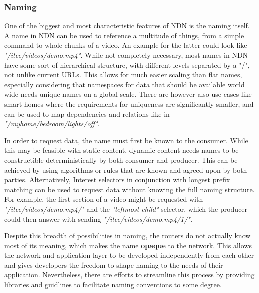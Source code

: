 \subsubsection{Naming}



One of the biggest and most characteristic features of NDN is the naming itself. A name in NDN can be used to reference a multitude of things, from a simple command to whole chunks of a video. An example for the latter could look like \textit{"/itec/videos/demo.mp4"}. While not completely necessary, most names in NDN have some sort of hierarchical structure, with different levels separated by a "/", not unlike current URLs. This allows for much easier scaling than flat names, especially considering that namespaces for data that should be available world wide needs unique names on a global scale. There are however also use cases like smart homes where the requirements for uniqueness are significantly smaller, and can be used to map dependencies and relations like in \textit{"/myhome/bedroom/lights/off"}.

In order to request data, the name must first be known to the consumer. While this may be feasible with static content, dynamic content needs names to be constructible deterministically by both consumer and producer. This can be achieved by using algorithms or rules that are known and agreed upon by both parties. Alternatively, Interest selectors in conjunction with longest prefix matching can be used to request data without knowing the full naming structure. For example, the first section of a video might be requested with \textit{"/itec/videos/demo.mp4/"} and the \textit{"leftmost-child"} selector, which the producer could then answer with sending \textit{"/itec/videos/demo.mp4/1/"}.

Despite this breadth of possibilities in naming, the routers do not actually know most of its meaning, which makes the name \textbf{opaque} to the network. This allows the network and application layer to be developed independently from each other and gives developers the freedom to shape naming to the needs of their application. Nevertheless, there are efforts to streamline this process by providing libraries and guidlines to facilitate naming conventions to some degree. \cite{ZABJ14,ZEBJ10}
